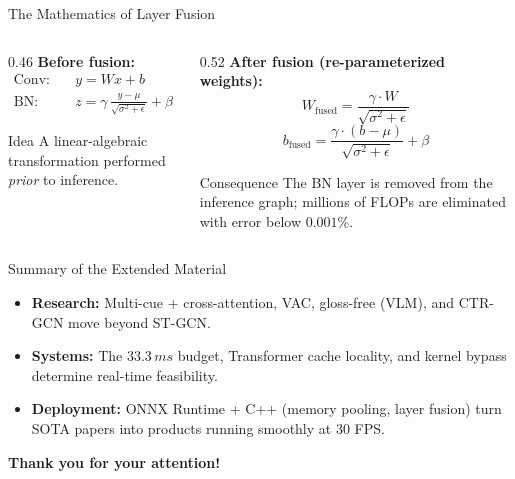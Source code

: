 \documentclass[aspectratio=169]{beamer}
\begin{document}
\begin{frame}{The Mathematics of Layer Fusion}
    \begin{columns}[T]
        \begin{column}{0.46\textwidth}
            \textbf{Before fusion:}
            \begin{align*}
                \text{Conv:}\quad & y = Wx + b \\[0.25cm]
                \text{BN:}\quad & z = \gamma\,\frac{y-\mu}{\sqrt{\sigma^2+\epsilon}} + \beta
            \end{align*}
            \vspace{0.2cm}
            \begin{block}{Idea}
                \small A linear-algebraic transformation performed \emph{prior} to inference.
            \end{block}
        \end{column}
        \begin{column}{0.52\textwidth}
            \textbf{After fusion (re-parameterized weights):}
            \[ W_{\text{fused}} = \frac{\gamma\cdot W}{\sqrt{\sigma^2+\epsilon}} \]
            \[ b_{\text{fused}} = \frac{\gamma\cdot(b-\mu)}{\sqrt{\sigma^2+\epsilon}} + \beta \]
            \vspace{0.15cm}
            \begin{exampleblock}{Consequence}
                \small The BN layer is removed from the inference graph; millions of FLOPs are eliminated with error below $0.001\%$.
            \end{exampleblock}
        \end{column}
    \end{columns}
\end{frame}

\begin{frame}{Summary of the Extended Material}
    \begin{itemize}
        \item \textbf{Research:} Multi-cue + cross-attention, VAC, gloss-free (VLM), and CTR-GCN move beyond ST-GCN.
        \vspace{0.2cm}
        \item \textbf{Systems:} The $33.3\,ms$ budget, Transformer cache locality, and kernel bypass determine real-time feasibility.
        \vspace{0.2cm}
        \item \textbf{Deployment:} ONNX Runtime + C++ (memory pooling, layer fusion) turn SOTA papers into products running smoothly at 30 FPS.
    \end{itemize}
\end{frame}


\begin{frame}
    \centering
    \Huge \textbf{Thank you for your attention!}
\end{frame}
\end{document}
